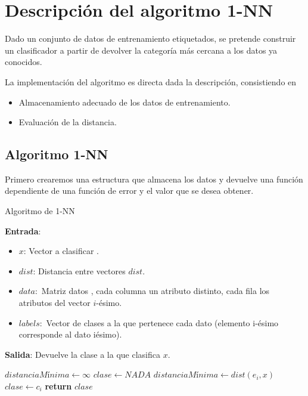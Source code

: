 \section{ Descripción del algoritmo 1-NN}

Dado un conjunto de datos de entrenamiento etiquetados, se pretende construir un clasificador 
a partir de devolver la categoría más cercana a los datos ya conocidos. 

La implementación del algoritmo es directa dada la descripción, consistiendo en 

\begin{itemize}
    \item Almacenamiento adecuado de los datos de entrenamiento.
    \item Evaluación de la distancia.
\end{itemize}

\subsection{Algoritmo 1-NN}

Primero crearemos una estructura que almacena los datos y devuelve
una función dependiente de una función de error 
y el valor que se desea obtener.

\begin{algorithm}
    \caption{Algoritmo de  1-NN}\label{euclid}
    \hspace*{\algorithmicindent} 
        \textbf{Entrada}:
        \begin{itemize}
            \item $x$: Vector a clasificar .
            \item $dist$: Distancia entre vectores $dist$.
            \item $data:$ Matriz  datos , cada columna un atributo distinto, cada fila los atributos del vector $i$-ésimo.
            \item $labels:$ Vector de clases a la que pertenece  cada dato (elemento i-ésimo corresponde al dato iésimo).
        \end{itemize}
        \hspace*{\algorithmicindent} 
        \textbf{Salida}:
    Devuelve la clase a la que clasifica $x$.        
    \begin{algorithmic}[1]
          \State $distanciaMínima \gets\infty$
          \State $clase \leftarrow NADA$
         
                \State $distanciaMínima \gets dist(e_i, x)$
                \State $clase  \gets c_i$
            \EndIf
        \EndFor
        \State \textbf{return} $clase$
      \EndProcedure
    \end{algorithmic}
  \end{algorithm}  


